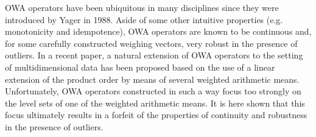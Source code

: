 
OWA operators have been ubiquitous in many disciplines since they were introduced by Yager in 1988. Aside of some other intuitive properties (e.g. monotonicity and idempotence), OWA operators are known to be continuous and, for some carefully constructed weighing vectors, very robust in the presence of outliers. In a recent paper, a natural extension of OWA operators to the setting of multidimensional data has been proposed based on the use of a linear extension of the product order by means of several weighted arithmetic means. Unfortunately, OWA operators constructed in such a way focus too strongly on the level sets of one of the weighted arithmetic means. It is here shown that this focus ultimately results in a forfeit of the properties of continuity and robustness in the presence of outliers. 


